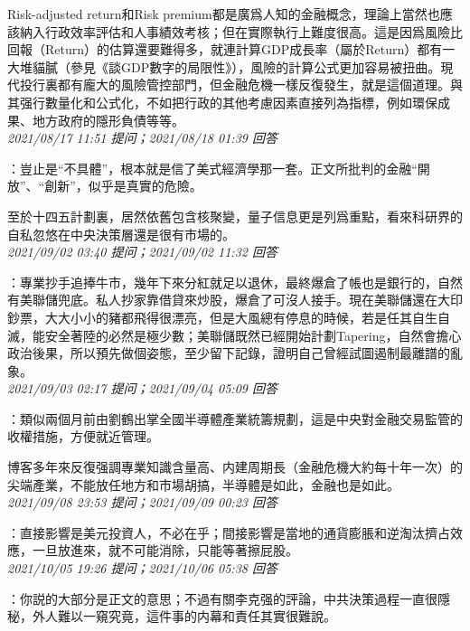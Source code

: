 \documentclass[twocolumn]{ctexart}
\begin{document}
Risk-adjusted return和Risk premium都是廣爲人知的金融概念，理論上當然也應該納入行政效率評估和人事績效考核；但在實際執行上難度很高。這是因爲風險比回報（Return）的估算還要難得多，就連計算GDP成長率（屬於Return）都有一大堆貓膩（參見《談GDP數字的局限性》），風險的計算公式更加容易被扭曲。現代投行裏都有龐大的風險管控部門，但金融危機一樣反復發生，就是這個道理。與其强行數量化和公式化，不如把行政的其他考慮因素直接列為指標，例如環保成果、地方政府的隱形負債等等。
\\

\textit{\hfill\noindent\small 2021/08/17 11:51 提问；2021/08/18 01:39 回答}

：豈止是“不具體”，根本就是信了美式經濟學那一套。正文所批判的金融“開放”、“創新”，似乎是真實的危險。

至於十四五計劃裏，居然依舊包含核聚變，量子信息更是列爲重點，看來科研界的自私忽悠在中央決策層還是很有市場的。
\\

\textit{\hfill\noindent\small 2021/09/02 03:40 提问；2021/09/02 11:32 回答}

：專業抄手追捧牛市，幾年下來分紅就足以退休，最終爆倉了帳也是銀行的，自然有美聯儲兜底。私人抄家靠借貸來炒股，爆倉了可沒人接手。現在美聯儲還在大印鈔票，大大小小的豬都飛得很漂亮，但是大風總有停息的時候，若是任其自生自滅，能安全著陸的必然是極少數；美聯儲既然已經開始計劃Tapering，自然會擔心政治後果，所以預先做個姿態，至少留下記錄，證明自己曾經試圖遏制最離譜的亂象。
\\

\textit{\hfill\noindent\small 2021/09/03 02:17 提问；2021/09/04 05:09 回答}

：類似兩個月前由劉鶴出掌全國半導體產業統籌規劃，這是中央對金融交易監管的收權措施，方便就近管理。

博客多年來反復强調專業知識含量高、内建周期長（金融危機大約每十年一次）的尖端產業，不能放任地方和市場胡搞，半導體是如此，金融也是如此。
\\

\textit{\hfill\noindent\small 2021/09/08 23:53 提问；2021/09/09 00:23 回答}

：直接影響是美元投資人，不必在乎；間接影響是當地的通貨膨脹和逆淘汰擠占效應，一旦放進來，就不可能消除，只能等著擦屁股。
\\

\textit{\hfill\noindent\small 2021/10/05 19:26 提问；2021/10/06 05:38 回答}

：你説的大部分是正文的意思；不過有關李克强的評論，中共決策過程一直很隱秘，外人難以一窺究竟，這件事的内幕和責任其實很難說。
\\
\end{document}
